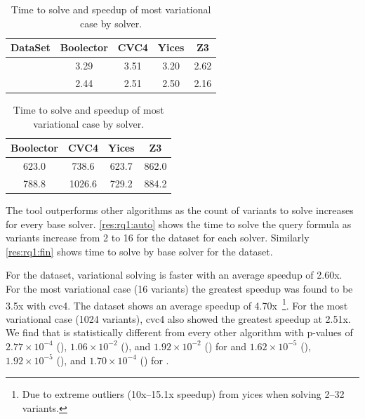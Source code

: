 \begin{table}
  \begin{subtable}[t]{0.45\textwidth}
    \centering
    \begin{tabular}{c || c | c | c | c}
      DataSet    & Boolector & CVC4 & Yices & Z3 \\
      \hline
      \auto{}    & 3.29      & 3.51 & 3.20  & 2.62 \\
      \fin{}     & 2.44      & 2.51 & 2.50  & 2.16 \\
    \end{tabular}
    \caption{Speedup by solver for the maximum variant case; 16 for \auto{},
      1024 for \fin{}.}%
    \label{tab:rq1:speedup}
  \end{subtable}
  \hfill
  \begin{subtable}[t]{0.45\textwidth}
    \centering
    \begin{tabular}{ c | c | c | c}
      Boolector & CVC4 & Yices & Z3 \\
      \hline
       623.0    & 738.6 & 623.7 & 862.0 \\
       788.8     & 1026.6 & 729.2  & 884.2 \\
    \end{tabular}
    \caption{Time [s] to solve with \vTov{} by solver.}%
    \label{tab:rq1:comparison}
  \end{subtable}
  \caption{Time to solve and speedup of most variational case by solver.}%
  \label{tab:rq1}
\end{table}

The \vsat{} tool outperforms other algorithms as the count of variants to solve
increases for every base solver. \autoref{res:rq1:auto} shows the time to solve
the query formula as variants increase from 2 to 16 for the \auto{} dataset for
each solver. Similarly \autoref{res:rq1:fin} shows time to solve by base solver
for the \fin{} dataset.

For the \auto{} dataset, variational solving is faster with an average speedup
of 2.60x. For the most variational case (16 variants) the greatest speedup was
found to be 3.5x with cvc4. The \fin{} dataset shows an average speedup of
4.70x~\footnote{Due to extreme outliers (10x--15.1x speedup) from yices when
  solving 2--32 variants.}. For the most variational case (1024 variants), cvc4
also showed the greatest speedup at 2.51x. We find that \vTov{} is statistically
different from every other algorithm with p-values of $2.77\times 10^{-4}$
(\vTop{}), $1.06\times 10^{-2}$ (\pTop{}), and $1.92\times 10^{-2}$ (\pTov{})
for \auto{} and $1.62\times 10^{-5}$ (\vTop{}), $1.92\times 10^{-5}$ (\pTop{}),
and $1.70\times 10^{-4}$ (\pTov{}) for \fin{}.

